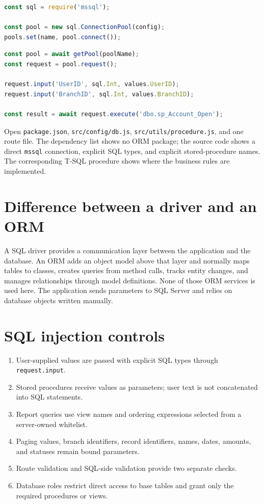 \documentclass[11pt,a4paper,oneside]{report}
\newcommand{\codepath}[1]{\nolinkurl{#1}}
\begin{document}
\begin{lstlisting}[language=JavaScript,caption={Direct SQL Server connection pool from \texttt{src/config/db.js}}]
const sql = require('mssql');

const pool = new sql.ConnectionPool(config);
pools.set(name, pool.connect());
\end{lstlisting}

\begin{lstlisting}[language=JavaScript,caption={Typed procedure execution from \texttt{src/utils/procedure.js}}]
const pool = await getPool(poolName);
const request = pool.request();

request.input('UserID', sql.Int, values.UserID);
request.input('BranchID', sql.Int, values.BranchID);

const result = await request.execute('dbo.sp_Account_Open');
\end{lstlisting}

\begin{defensebox}
Open \texttt{package.json}, \codepath{src/config/db.js}, \codepath{src/utils/procedure.js}, and one route file. The dependency list shows no ORM package; the source code shows a direct \texttt{mssql} connection, explicit SQL types, and explicit stored-procedure names. The corresponding T-SQL procedure shows where the business rules are implemented.
\end{defensebox}

\section{Difference between a driver and an ORM}
A SQL driver provides a communication layer between the application and the database. An ORM adds an object model above that layer and normally maps tables to classes, creates queries from method calls, tracks entity changes, and manages relationships through model definitions. None of those ORM services is used here. The application sends parameters to SQL Server and relies on database objects written manually.

\section{SQL injection controls}
\begin{enumerate}
\item User-supplied values are passed with explicit SQL types through \texttt{request.input}.
\item Stored procedures receive values as parameters; user text is not concatenated into SQL statements.
\item Report queries use view names and ordering expressions selected from a server-owned whitelist.
\item Paging values, branch identifiers, record identifiers, names, dates, amounts, and statuses remain bound parameters.
\item Route validation and SQL-side validation provide two separate checks.
\item Database roles restrict direct access to base tables and grant only the required procedures or views.
\end{enumerate}
\end{document}
